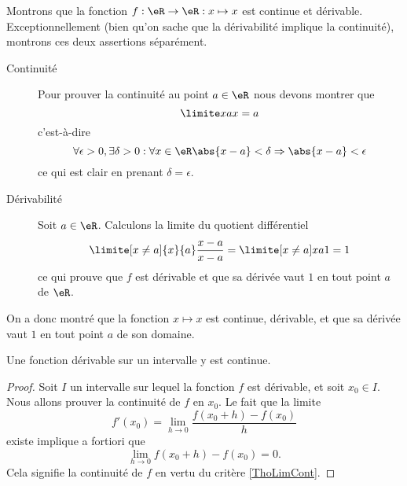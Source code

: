 \begin{example}
      Montrons que la fonction $f : \eR \to \eR : x\mapsto x$ est continue et dérivable. Exceptionnellement (bien qu'on sache que la dérivabilité implique la continuité), montrons ces deux assertions séparément.
      \begin{description}
      \item[Continuité] Pour prouver la continuité au point $a \in \eR$ nous devons montrer que
     \begin{equation}
       \limite x a x = a
     \end{equation}
     c'est-à-dire
     \begin{equation}
       \forall \epsilon > 0, \exists \delta > 0 :  \forall x \in \eR \abs{x-a} <
       \delta \Rightarrow \abs{x-a} < \epsilon
     \end{equation}
     ce qui est clair en prenant $\delta = \epsilon$.

      \item[Dérivabilité] Soit $a \in \eR$. Calculons la limite du quotient différentiel
        \begin{equation}
          \limite[x\neq a]{x}{a} \frac{x-a}{x-a} = \limite[x\neq a]x a 1 = 1
        \end{equation}
        ce qui prouve que $f$ est dérivable et que sa dérivée vaut $1$ en
        tout point $a$ de $\eR$.
      \end{description}

     On a donc montré que la fonction $x \mapsto x$ est continue, dérivable, et que sa dérivée vaut $1$ en tout point $a$ de son domaine.

\end{example}

\begin{proposition} \label{PropSFyxOWF}
    Une fonction dérivable sur un intervalle y est continue.
\end{proposition}

\begin{proof}
    Soit \( I\) un intervalle sur lequel la fonction \( f\) est dérivable, et soit \( x_0\in I\). Nous allons prouver la continuité de \( f\) en \( x_0\). Le fait que la limite
    \begin{equation}
        f'(x_0)=\lim_{h\to 0} \frac{ f(x_0+h)-f(x_0) }{ h }
    \end{equation}
    existe implique a fortiori que 
    \begin{equation}
        \lim_{h\to 0} f(x_0+h)-f(x_0)=0.
    \end{equation}
    Cela signifie la continuité de \( f\) en vertu du critère \ref{ThoLimCont}.
\end{proof}

